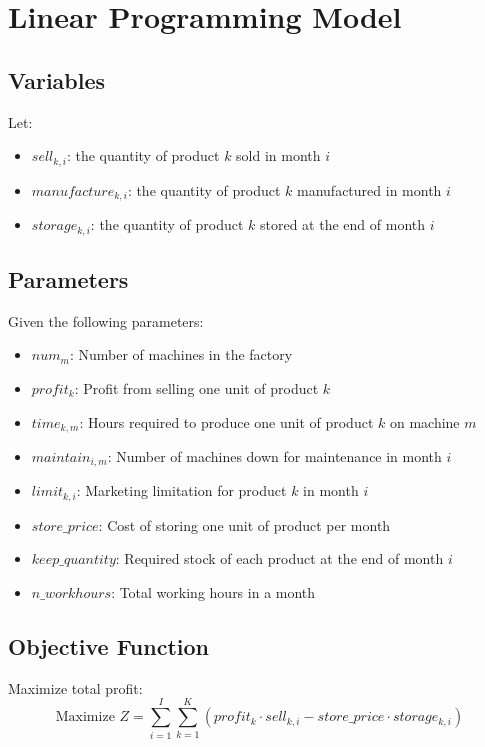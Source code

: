\documentclass{article}
\begin{document}
\section*{Linear Programming Model}

\subsection*{Variables}
Let:
\begin{itemize}
    \item \( sell_{k, i} \): the quantity of product \( k \) sold in month \( i \)
    \item \( manufacture_{k, i} \): the quantity of product \( k \) manufactured in month \( i \)
    \item \( storage_{k, i} \): the quantity of product \( k \) stored at the end of month \( i \)
\end{itemize}

\subsection*{Parameters}
Given the following parameters:
\begin{itemize}
    \item \( num_{m} \): Number of machines in the factory
    \item \( profit_{k} \): Profit from selling one unit of product \( k \)
    \item \( time_{k, m} \): Hours required to produce one unit of product \( k \) on machine \( m \)
    \item \( maintain_{i, m} \): Number of machines down for maintenance in month \( i \)
    \item \( limit_{k, i} \): Marketing limitation for product \( k \) in month \( i \)
    \item \( store\_price \): Cost of storing one unit of product per month
    \item \( keep\_quantity \): Required stock of each product at the end of month \( i \)
    \item \( n\_workhours \): Total working hours in a month
\end{itemize}

\subsection*{Objective Function}
Maximize total profit:
\[
\text{Maximize } Z = \sum_{i=1}^{I} \sum_{k=1}^{K} (profit_{k} \cdot sell_{k, i} - store\_price \cdot storage_{k, i})
\]
\end{document}
